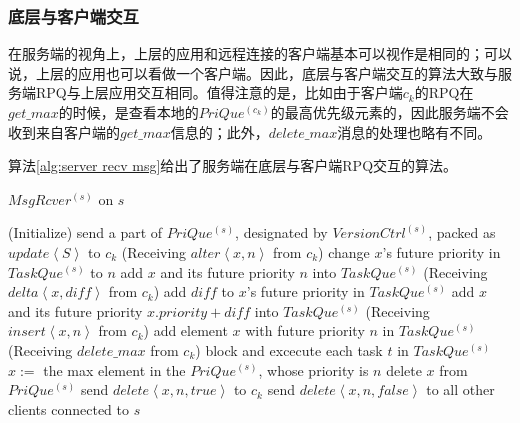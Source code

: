 		\subsubsection{底层与客户端交互}
			\par 在服务端的视角上，上层的应用和远程连接的客户端基本可以视作是相同的；可以说，上层的应用也可以看做一个客户端。因此，底层与客户端交互的算法大致与服务端RPQ与上层应用交互相同。值得注意的是，比如由于客户端$c_k$的RPQ在$get\_max$的时候，是查看本地的$PriQue^{(c_k)}$的最高优先级元素的，因此服务端不会收到来自客户端的$get\_max$信息的；此外，$delete\_max$消息的处理也略有不同。
			\par 算法\ref{alg:server recv msg}给出了服务端在底层与客户端RPQ交互的算法。
			\begin{algorithm}
				\caption{$MsgRcver^{(s)}$ on $s$}
				\label{alg:server recv msg}
				\Begin(Initialize)
				{
					send a part of $PriQue^{(s)}$, designated by $VersionCtrl^{(s)}$, packed as $update\left\langle S\right\rangle $ to $c_k$\;
				}
				\Begin(Receiving $alter\left\langle x,n\right\rangle $ from $c_k$)
				{
					{
						change $x$'s future priority in $TaskQue^{(s)}$ to $n$\;
					}
					\Else
					{
						add $x$ and its future priority $n$ into $TaskQue^{(s)}$\;
					}
				}
				\Begin(Receiving $delta\left\langle x,diff\right\rangle $ from $c_k$)
				{
					{
						add $diff$ to $x$'s future priority in $TaskQue^{(s)}$\;
					}
					\Else
					{
						add $x$ and its future priority $x.priority+diff$ into $TaskQue^{(s)}$\;
					}
				}
				\Begin(Receiving $insert\left\langle x,n\right\rangle $ from $c_k$)
				{
					add element $x$ with future priority $n$ in $TaskQue^{(s)}$\;
				}
				\Begin(Receiving $delete\_max$ from $c_k$)
				{
					block and excecute each task $t$ in $TaskQue^{(s)}$\;
					$x:=$ the max element in the $PriQue^{(s)}$, whose priority is $n$\;
					delete $x$ from $PriQue^{(s)}$\;
					send $delete\left\langle x,n,\textit{true}\right\rangle $ to $c_k$\;
					send $delete\left\langle x,n,\textit{false}\right\rangle $ to all other clients connected to $s$\;
				}
			\end{algorithm}
